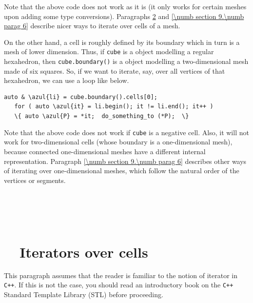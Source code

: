 Note that the above code does not work as it is (it only works for certain meshes upon
adding some type conversions).
Paragraphs \ref{\numb section 9.\numb parag 5} and \ref{\numb section 9.\numb parag 6}
describe nicer ways to iterate over cells of a mesh.

On the other hand, a cell is roughly defined by its boundary which in turn is a mesh of
lower dimension.
Thus, if {\small\tt cube} is a {\small\tt {}} object modelling a regular hexahedron,
then {\small\tt cube.boundary()} is a {\small\tt {}} object modelling a
two-dimensional mesh made of six squares.
So, if we want to iterate, say, over all vertices of that hexahedron, we can use a 
loop like below.

\begin{Verbatim}[commandchars=\\\{\},formatcom=\small\tt,
   baselinestretch=0.94,framesep=2mm                      ]
   auto & \azul{li} = cube.boundary().cells[0];
   for ( auto \azul{it} = li.begin(); it != li.end(); it++ )
   \{ auto \azul{P} = *it;  do_something_to (*P);  \}
\end{Verbatim}

Note that the above code does not work if {\small\tt cube} is a negative cell.
Also, it will not work for two-dimensional cells (whose boundary is a one-dimensional mesh),
because connected one-dimensional meshes have a different internal representation.
Paragraph \ref{\numb section 9.\numb parag 6} describes other ways of iterating
over one-dimensional meshes, which follow the natural order of the vertices or segments.


\section{~~\cinza{[empty]}}\label{\numb section 9.\numb parag 4}

\section{~~Iterators over cells}\label{\numb section 9.\numb parag 5}

This paragraph assumes that the reader is familiar to the notion of iterator in {\tt C++}.
If this is not the case, you should read an introductory book on the {\tt C++}
Standard Template Library (STL) before proceeding.

